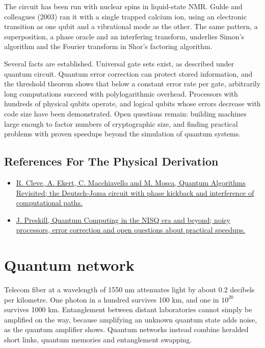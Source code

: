 \documentclass[11pt,oneside]{book}
\begin{document}
The circuit has been run with nuclear spins in liquid-state NMR. Gulde and colleagues (2003) ran it with a single trapped calcium ion, using an electronic transition as one qubit and a vibrational mode as the other. The same pattern, a superposition, a phase oracle and an interfering transform, underlies Simon's algorithm and the Fourier transform in Shor's factoring algorithm.

Several facts are established. Universal gate sets exist, as described under quantum circuit. Quantum error correction can protect stored information, and the threshold theorem shows that below a constant error rate per gate, arbitrarily long computations succeed with polylogarithmic overhead. Processors with hundreds of physical qubits operate, and logical qubits whose errors decrease with code size have been demonstrated. Open questions remain: building machines large enough to factor numbers of cryptographic size, and finding practical problems with proven speedups beyond the simulation of quantum systems.

\subsection*{References For The Physical Derivation}
\begin{itemize}
\item \href{https://arxiv.org/abs/quant-ph/9708016}{R. Cleve, A. Ekert, C. Macchiavello and M. Mosca, Quantum Algorithms Revisited; the Deutsch-Jozsa circuit with phase kickback and interference of computational paths.}
\item \href{https://arxiv.org/abs/1801.00862}{J. Preskill, Quantum Computing in the NISQ era and beyond; noisy processors, error correction and open questions about practical speedups.}
\end{itemize}





\clearpage

\section{Quantum network}

\label{topic:quantum-network}

Telecom fiber at a wavelength of 1550 nm attenuates light by about 0.2 decibels per kilometre. One photon in a hundred survives 100 km, and one in \(10^{20}\) survives 1000 km. Entanglement between distant laboratories cannot simply be amplified on the way, because amplifying an unknown quantum state adds noise, as the quantum amplifier shows. Quantum networks instead combine heralded short links, quantum memories and entanglement swapping.
\end{document}
